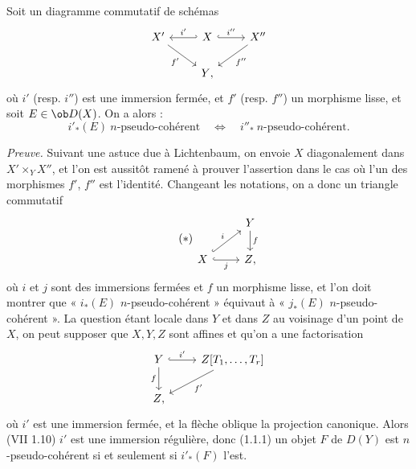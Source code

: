 Soit un diagramme commutatif de schémas
\[
\begin{tikzcd}
X' \arrow[dr,"f'"'] & X \arrow[l,hook',"i'"'] \arrow[r,hook,"i''"] & X'' \arrow[dl,"f''"]\\
& Y{,} &
\end{tikzcd}
\]
où \(i'\) (resp. \(i''\)) est une immersion fermée, et \(f'\) (resp. \(f''\)) un morphisme lisse, et soit \(E\in\ob D(X)\). On a alors :
\[
  i'_*(E)\ n\text{-pseudo-cohérent}
  \quad\Longleftrightarrow\quad
  i''_*\ n\text{-pseudo-cohérent}.
\]

\emph{Preuve.} Suivant une astuce due à Lichtenbaum, on envoie \(X\) diagonalement dans \(X'\times_YX''\), et l'on est aussitôt ramené à prouver l'assertion dans le cas où l'un des morphismes \(f'\), \(f''\) est l'identité. Changeant les notations, on a donc un triangle commutatif
\begin{equation}\tag{$*$}
\begin{tikzcd}
& Y \arrow[d,"f"]\\
X \arrow[r,hook,"j"'] \arrow[ur,hook,"i"] & Z{,}
\end{tikzcd}
\end{equation}
où \(i\) et \(j\) sont des immersions fermées et \(f\) un morphisme lisse, et l'on doit montrer que « \(i_*(E)\) \(n\)-pseudo-cohérent » équivaut à « \(j_*(E)\) \(n\)-pseudo-cohérent ». La question étant locale dans \(Y\) et dans \(Z\) au voisinage d'un point de \(X\), on peut supposer que \(X,Y,Z\) sont affines et qu'on a une factorisation
\[
\begin{tikzcd}
Y \arrow[r,hook,"i'"] \arrow[d,"f"'] & Z[T_1,\ldots,T_r]\arrow[dl,"f'"]\\
Z{,}&
\end{tikzcd}
\]
où \(i'\) est une immersion fermée, et la flèche oblique la projection canonique. Alors (VII 1.10) \(i'\) est une immersion régulière, donc (1.1.1) un objet \(F\) de \(D(Y)\) est \(n\)-pseudo-cohérent si et seulement si \(i'_*(F)\) l'est.

